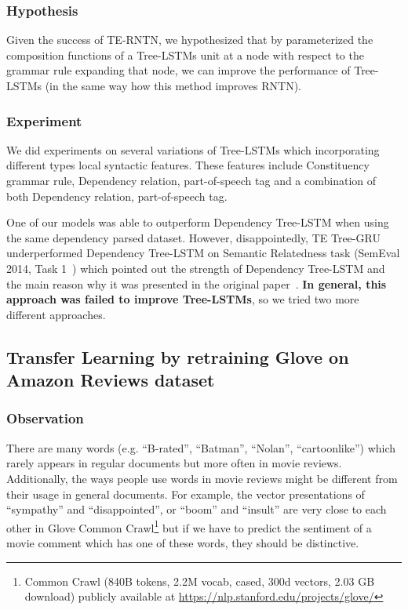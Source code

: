 \subsubsection{Hypothesis}
Given the success of TE-RNTN, we hypothesized that by parameterized the composition functions of a Tree-LSTMs unit at a node with respect to the grammar rule expanding that node, we can improve the performance of Tree-LSTMs (in the same way how this method improves RNTN).

\subsubsection{Experiment}
We did experiments on several variations of Tree-LSTMs which incorporating different types local syntactic features.
These features include Constituency grammar rule, Dependency relation, part-of-speech tag and a combination of both Dependency relation, part-of-speech tag.

One of our models was able to outperform Dependency Tree-LSTM when using the same dependency parsed dataset.
However, disappointedly, TE Tree-GRU underperformed Dependency Tree-LSTM on Semantic Relatedness task (SemEval 2014, Task 1~\cite{SemeEvalTask1}) which pointed out the strength of Dependency Tree-LSTM and the main reason why it was presented in the original paper~\cite{treeLSTM}.
\textbf{In general, this approach was failed to improve Tree-LSTMs}, so we tried two more different approaches.

\subsection{Transfer Learning by retraining Glove on Amazon Reviews dataset}
\label{sec:second-method}
\subsubsection{Observation}
There are many words (e.g. ``B-rated'', ``Batman'', ``Nolan'', ``cartoonlike'') which rarely appears in regular documents but more often in movie reviews.
Additionally, the ways people use words in movie reviews might be different from their usage in general documents.
For example, the vector presentations of ``sympathy'' and ``disappointed'', or ``boom'' and ``insult'' are very close to each other in Glove Common Crawl\footnote{Common Crawl (840B tokens, 2.2M vocab, cased, 300d vectors, 2.03 GB download) publicly available at \url{https://nlp.stanford.edu/projects/glove/}} but if we have to predict the sentiment of a movie comment which has one of these words, they should be distinctive.

